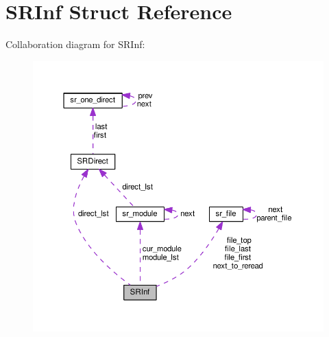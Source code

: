 \hypertarget{structSRInf}{}\section{S\+R\+Inf Struct Reference}
\label{structSRInf}


Collaboration diagram for S\+R\+Inf\+:\nopagebreak
\begin{figure}[H]
\begin{center}
\leavevmode
\includegraphics[width=350pt]{structSRInf__coll__graph}
\end{center}
\end{figure}
